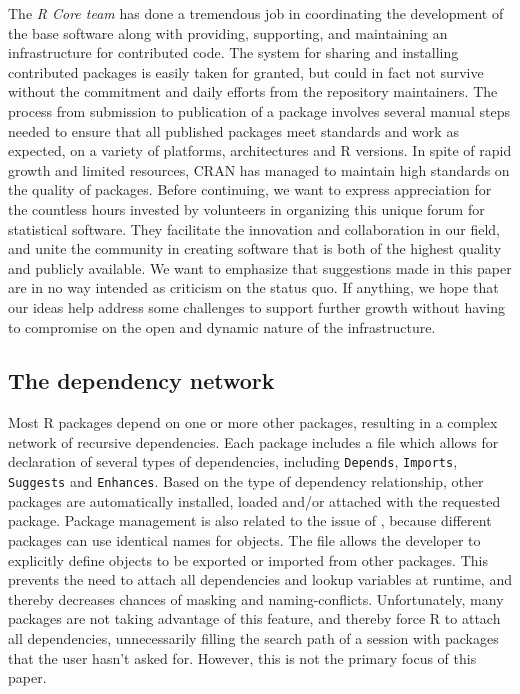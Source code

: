 The \emph{R Core team} has done a tremendous job in coordinating the
development of the base software along with providing, supporting, and maintaining an
infrastructure for contributed code. The system for sharing and installing
contributed packages is easily taken for granted, but could in fact not
survive without the commitment and daily efforts from the repository
maintainers. The process from submission to publication of a package involves
several manual steps needed to ensure that all published packages
meet standards and work as expected, on a variety of platforms, architectures
and R versions. In spite of rapid growth and limited resources, CRAN has
managed to maintain high standards on the quality of packages. Before
continuing, we want to express appreciation for the countless hours invested
by volunteers in organizing this unique forum for statistical software.
They facilitate the innovation and collaboration in our field,
and unite the community in creating software that is both of the highest
quality and publicly available. We want to emphasize that suggestions made in
this paper are in no way intended as criticism on the status quo. If anything,
we hope that our ideas help address some challenges to support further growth
without having to compromise on the open and dynamic nature of the
infrastructure.

\subsection{The dependency network}

Most R packages depend on one or more other packages, resulting in a complex
network of recursive dependencies. Each package includes a 
file which allows for declaration of several types of dependencies, including
\texttt{Depends}, \texttt{Imports}, \texttt{Suggests} and \texttt{Enhances}. Based on
the type of dependency relationship, other packages are automatically
installed, loaded and/or attached with the requested package. Package
management is also related to the issue of , because different
packages can use identical names for objects. The  file allows
the developer to explicitly define objects to be exported or imported from
other packages. This prevents the need to attach all dependencies and lookup
variables at runtime, and thereby decreases chances of masking and
naming-conflicts. Unfortunately, many packages are not taking advantage of this
feature, and thereby force R to attach all dependencies, unnecessarily filling
the search path of a session with packages that the user hasn't asked for.
However, this is not the primary focus of this paper.

